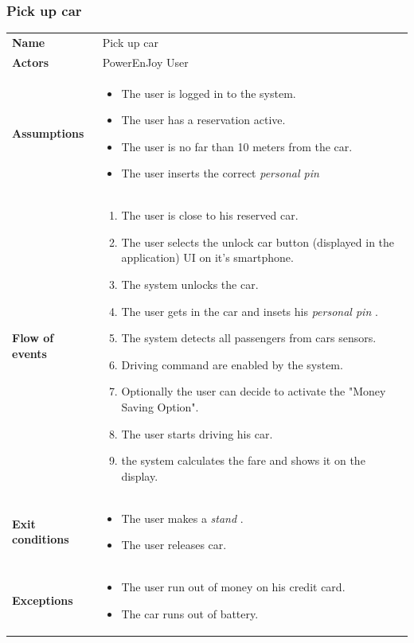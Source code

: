 \documentclass[english]{article}
\newcommand{\stand}{\textit{stand }}
\newcommand{\personalpin}{\textit{personal pin }}
\begin{document}
	\subsubsection{Pick up car}
	\begin{center}
	\begin{tabular}{l||p{10cm}}
	\textbf{Name} 
		& Pick up car\\ [8px]
	\textbf{Actors} 
		& PowerEnJoy User\\ [8px]
	\textbf{Assumptions} 
	& \begin{itemize}
		\item The user is logged in to the system.
		\item The user has a reservation active.
		\item The user is no far than 10 meters from the car.
		\item The user inserts the correct \personalpin 
	\end{itemize}\\
	\textbf{Flow of events}
		& \begin{enumerate}
 		\item The user is close to his reserved car.
 		\item The user selects the unlock car button (displayed in the application) UI on it's smartphone.
		\item The system unlocks the car.
		\item The user gets in the car and insets his \personalpin.
		\item The system detects all passengers from cars sensors.
		\item Driving command are enabled by the system. 
		\item Optionally the user can decide to activate the "Money Saving Option".
		\item The user starts driving his car.
		\item the system calculates the fare and shows it on the display.
		\end{enumerate}\\ 
	\textbf{Exit conditions}
		&\begin{itemize}
			\item The user makes a \stand.
			\item The user releases car.
		\end{itemize}\\
	\textbf{Exceptions}
		& \begin{itemize}
			\item The user run out of money on his credit card.
			\item The car runs out of battery.
		\end{itemize}
	\end{tabular}
	\end{center}
	
\end{document}
